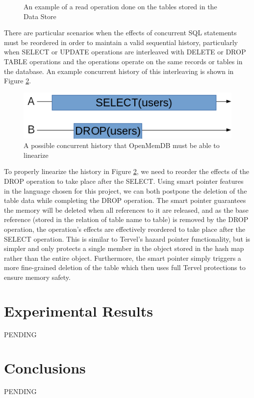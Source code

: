 \documentclass[letter,11pt]{article}
\let\oldReturn\Return
\renewcommand{\Return}{\State\oldReturn}
\begin{document}
\begin{figure}[h]
 \begin{algorithmic}
  \EndFor
 \Else
 \EndIf
 \EndFunction
 \end{algorithmic}
 \caption{An example of a read operation done on the tables stored in the Data Store}
 \label{read_op}
\end{figure}

\par\vspace{\baselineskip}
There are particular scenarios when the effects of concurrent SQL statements must be reordered
in order to maintain a valid sequential history, particularly when SELECT or UPDATE operations
are interleaved with DELETE or DROP TABLE operations and the operations operate on the same 
records or tables in the database. An example concurrent history of this interleaving is shown in 
Figure \ref{concurrent_history}.

\begin{figure}[h]
\centering
  \includegraphics[scale=.75]{concurrent_history_1}
  \caption{A possible concurrent history that OpenMemDB must be able to linearize}
  \label{concurrent_history}
\end{figure}

\par\vspace{\baselineskip}
To properly linearize the history in Figure \ref{concurrent_history}, we need to reorder 
the effects of the DROP operation to take place after the SELECT. Using smart pointer features 
in the language chosen for this project, we can both postpone the deletion of the 
table data while completing the DROP operation. The smart pointer guarantees the memory will 
be deleted when all references to it are released, and as the base reference (stored in the 
relation of table name to table) is removed by the DROP operation, the operation's effects 
are effectively reordered to take place after the SELECT operation. This is similar to Tervel's 
hazard pointer functionality, but is simpler and only protects a single member in the object stored
in the hash map rather than the entire object. Furthermore, the smart pointer simply triggers a 
more fine-grained deletion of the table which then uses full Tervel protections to ensure memory
safety.

\section{Experimental Results}
PENDING

\section{Conclusions}
PENDING

\newpage


\newpage
\end{document}
